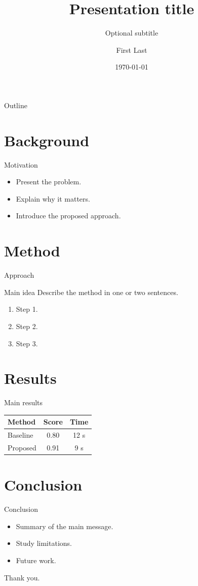 \documentclass[aspectratio=169]{beamer}
\title[Short title]{Presentation title}
\subtitle{Optional subtitle}
\author{First Last}
\institute{Institution}
\date{\today}
\begin{document}
\begin{frame}
  \titlepage
\end{frame}

\begin{frame}{Outline}
  \tableofcontents
\end{frame}

\section{Background}

\begin{frame}{Motivation}
  \begin{itemize}
    \item Present the problem.
    \item Explain why it matters.
    \item Introduce the proposed approach.
  \end{itemize}
\end{frame}

\section{Method}

\begin{frame}{Approach}
  \begin{block}{Main idea}
    Describe the method in one or two sentences.
  \end{block}

  \begin{enumerate}
    \item Step 1.
    \item Step 2.
    \item Step 3.
  \end{enumerate}
\end{frame}

\section{Results}

\begin{frame}{Main results}
  \begin{table}
    \centering
    \begin{tabular}{lcc}
      \toprule
      Method & Score & Time \\
      \midrule
      Baseline & 0.80 & 12 s \\
      Proposed & 0.91 & 9 s \\
      \bottomrule
    \end{tabular}
  \end{table}
\end{frame}

\section{Conclusion}

\begin{frame}{Conclusion}
  \begin{itemize}
    \item Summary of the main message.
    \item Study limitations.
    \item Future work.
  \end{itemize}
\end{frame}

\begin{frame}
  \centering
  \Large Thank you.
\end{frame}
\end{document}
